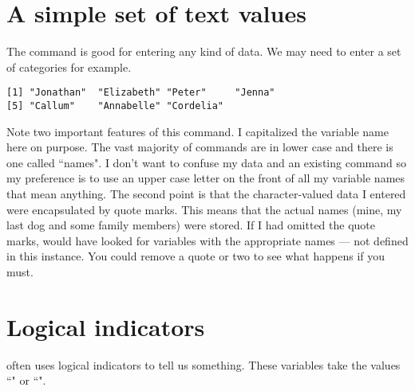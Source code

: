  
\section{A simple set of text values} 
 
The  command is good for entering any kind of data. We may need to enter a set of categories for example. 
\begin{knitrout}
\color{fgcolor}\begin{kframe}
\begin{alltt}
\hlstd{> } \hlkwb{=} \hlstd{(}\hlstd{,} \hlstd{,} \hlstd{,} \hlstd{,} \hlstd{,} \hlstd{,} \hlstd{)}
\hlstd{> }
\end{alltt}
\begin{verbatim}
[1] "Jonathan"  "Elizabeth" "Peter"     "Jenna"    
[5] "Callum"    "Annabelle" "Cordelia" 
\end{verbatim}
\end{kframe}
\end{knitrout}
Note two important features of this command. I capitalized the variable name here on purpose. The vast majority of \R{} commands are in lower case and there is one called ``names". I don't want to confuse my data and an existing \R{} command so my preference is to use an upper case letter on the front of all my variable names that mean anything. The second point is that the character-valued data I entered were encapsulated by quote marks. This means that the actual names (mine, my last dog and some family members) were stored. If I had omitted the quote marks, \R{} would have looked for variables with the appropriate names --- not defined in this instance. You could remove a quote or two to see what happens if you must. 
 
\section{Logical indicators} 
 
\R{} often uses logical indicators to tell us something. These variables take the values ``" or ``". 
 
